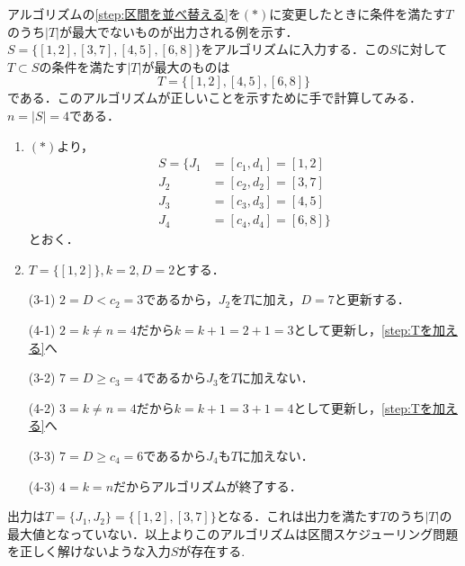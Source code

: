 \documentclass[dvipdfmx]{jsreport}
\begin{document}
\begin{souanswer} %
	アルゴリズムの\eqref{step:区間を並べ替える}を$(*)$に変更したときに条件を満たす$T$のうち$|T|$が最大でないものが出力される例を示す．\\
	$S= \{[1, 2], [3, 7], [4, 5], [6, 8]\}$をアルゴリズムに入力する．この$S$に対して$T\subset S$の条件を満たす$|T|$が最大のものは
\begin{equation}
	T= \{[1, 2], [4, 5], [6, 8]\}
\end{equation}
	である．このアルゴリズムが正しいことを示すために手で計算してみる．$n= |S|= 4$である．
\begin{enumerate}
	\item $(*)$より，
\begin{align}
	S= \{
		J_1&= [c_1, d_1]= [1, 2]\\
		J_2&= [c_2, d_2]= [3, 7]\\
		J_3&= [c_3, d_3]= [4, 5]\\
		J_4&= [c_4, d_4]= [6, 8]
		\}
\end{align}
	とおく．
	\item $T= \{[1, 2]\}, k= 2, D= 2$とする．
	\item[(3-1)] $2= D< c_2= 3$であるから，$J_2$を$T$に加え，$D= 7$と更新する．
	\item[(4-1)] $2= k\ne n= 4$だから$k= k+ 1= 2+ 1= 3$として更新し，\eqref{step:Tを加える}へ

	\item[(3-2)] $7= D\ge c_3= 4$であるから$J_3$を$T$に加えない．
	\item[(4-2)] $3= k\ne n= 4$だから$k= k+ 1= 3+ 1= 4$として更新し，\eqref{step:Tを加える}へ

	\item[(3-3)] $7= D\ge c_4= 6$であるから$J_4$も$T$に加えない．
	\item[(4-3)] $4= k= n$だからアルゴリズムが終了する．
\end{enumerate}
	出力は$T= \{J_1, J_2\}= \{[1, 2], [3, 7]\}$となる．これは出力を満たす$T$のうち$|T|$の最大値となっていない．以上よりこのアルゴリズムは区間スケジューリング問題を正しく解けないような入力$S$が存在する.
\end{souanswer}
\end{document}
